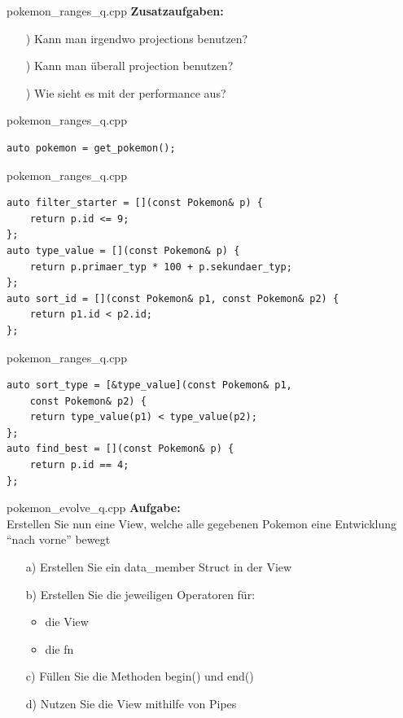 \begin{frame}{pokemon\_ranges\_q.cpp}
    \textbf{Zusatzaufgaben:}\\
    \begin{enumerate} %
        \item[\✨)] Kann man irgendwo projections benutzen?
        \item[\✨)] Kann man überall projection benutzen?
        \item[\✨)] Wie sieht es mit der performance aus?
    \end{enumerate}
\end{frame}

\begin{frame}[fragile]{pokemon\_ranges\_q.cpp}
    \begin{verbatim}
auto pokemon = get_pokemon();
    \end{verbatim}
\end{frame}

\begin{frame}[fragile]{pokemon\_ranges\_q.cpp}
    \begin{verbatim}
auto filter_starter = [](const Pokemon& p) {
    return p.id <= 9;
};
auto type_value = [](const Pokemon& p) {
    return p.primaer_typ * 100 + p.sekundaer_typ;
};
auto sort_id = [](const Pokemon& p1, const Pokemon& p2) {
    return p1.id < p2.id;
};
    \end{verbatim}
\end{frame}

\begin{frame}[fragile]{pokemon\_ranges\_q.cpp}
    \begin{verbatim}
auto sort_type = [&type_value](const Pokemon& p1,
    const Pokemon& p2) {
    return type_value(p1) < type_value(p2);
};
auto find_best = [](const Pokemon& p) {
    return p.id == 4;
};
    \end{verbatim}
\end{frame}

\begin{frame}{pokemon\_evolve\_q.cpp}
    \textbf{Aufgabe:}\\
    Erstellen Sie nun eine View, welche alle gegebenen Pokemon eine Entwicklung \enquote{nach vorne} bewegt

    \begin{enumerate} %
        \item[a)] Erstellen Sie ein data\_member Struct in der View
        \item[b)] Erstellen Sie die jeweiligen Operatoren für:

            \begin{itemize}
                \item die View
                \item die fn
            \end{itemize}
        \item[c)] Füllen Sie die Methoden begin() und end()
        \item[d)] Nutzen Sie die View mithilfe von Pipes
    \end{enumerate}
\end{frame}

